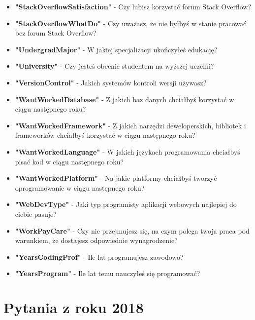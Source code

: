 \begin{appendices}
\begin{itemize}
        \item \textbf{"StackOverflowSatisfaction"} - Czy lubisz korzystać forum Stack Overflow?
        \item \textbf{"StackOverflowWhatDo"} - Czy uważasz, że nie byłbyś w stanie pracować bez forum Stack Overflow?
        \item \textbf{"UndergradMajor"} - W jakiej specjalizacji ukończyłeś edukację?
        \item \textbf{"University"} - Czy jesteś obecnie studentem na wyższej uczelni?
        \item \textbf{"VersionControl"} - Jakich systemów kontroli wersji używasz?
        \item \textbf{"WantWorkedDatabase"} - Z jakich baz danych chciałbyś korzystać w ciągu następnego roku?
        \item \textbf{"WantWorkedFramework"} - Z jakich narzędzi deweloperskich, bibliotek i frameworków chciałbyś korzystać w ciągu następnego roku?
        \item \textbf{"WantWorkedLanguage"} - W jakich językach programowania chciałbyś pisać kod w ciągu następnego roku?
        \item \textbf{"WantWorkedPlatform"} - Na jakie platformy chciałbyś tworzyć oprogramowanie w ciągu następnego roku?
        \item \textbf{"WebDevType"} - Jaki typ programisty aplikacji webowych najlepiej do ciebie pasuje?
        \item \textbf{"WorkPayCare"} - Czy nie przejmujesz się, na czym polega twoja praca pod warunkiem, że dostajesz odpowiednie wynagrodzenie?
        \item \textbf{"YearsCodingProf"} - Ile lat programujesz zawodowo?
        \item \textbf{"YearsProgram"} - Ile lat temu nauczyłeś się programować?
    \end{itemize}


    \section{Pytania z roku 2018}\label{pytania-2018}



\end{appendices}
